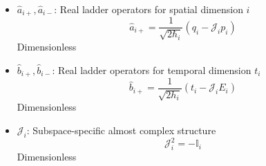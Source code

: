 \documentclass{article}
\begin{document}
\begin{itemize}
\item $\hat{a}_{i+}, \hat{a}_{i-}$: Real ladder operators for spatial dimension $i$
    \begin{equation}
    \hat{a}_{i+} = \frac{1}{\sqrt{2\hbar_i}}(q_i - \mathcal{J}_i p_i)
    \end{equation}
    Dimensionless
    
\item $\hat{b}_{i+}, \hat{b}_{i-}$: Real ladder operators for temporal dimension $t_i$
    \begin{equation}
    \hat{b}_{i+} = \frac{1}{\sqrt{2h_i}}(t_i - \mathcal{J}_i E_i)
    \end{equation}
    Dimensionless
    
\item $\mathcal{J}_i$: Subspace-specific almost complex structure
    \begin{equation}
    \mathcal{J}_i^2 = -\mathbb{I}_i
    \end{equation}
    Dimensionless
\end{itemize}
\end{document}
